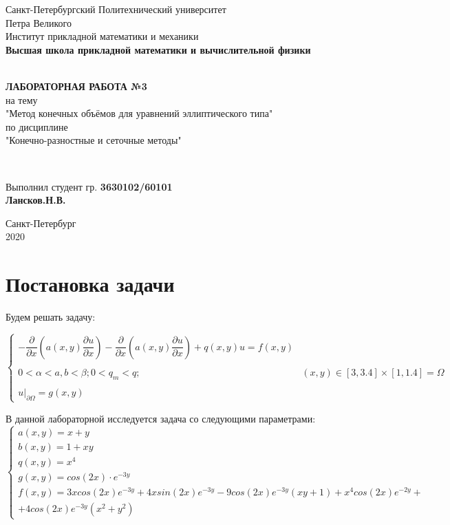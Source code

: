 \documentclass[12pt]{article}
\renewcommand{\listoffigures}{\begingroup  %
\tocsection
\tocfile{\listfigurename}{lof}
\endgroup}
\renewcommand{\listoftables}{\begingroup  %
\tocsection
\tocfile{\listtablename}{lot}
\endgroup}
\begin{document}
\begin{titlepage}
	\center
		Санкт-Петербургский Политехнический 
		университет \\ Петра Великого\\
		Институт прикладной математики и механики
		\\ \textbf{Высшая школа прикладной математики и вычислительной физики}

	\vfill ~
	\textbf{
		\\ \large ЛАБОРАТОРНАЯ РАБОТА №3
	}
	\\	на тему 
	\\ "Метод конечных объёмов для уравнений эллиптического типа"
	\\ по дисциплине
	\\ "Конечно-разностные и сеточные методы"

	\vfill ~

	Выполнил студент гр. \textbf{3630102/60101} \\
	\textbf{Лансков.Н.В.} \\ 

\vfill

{\large}	Санкт-Петербург
\\ 2020
\end{titlepage}


\tableofcontents 
\newpage
\listoffigures
\newpage
\listoftables
\newpage

\section{Постановка задачи}

Будем решать задачу:

$$
\begin{cases}
-\dfrac{\partial}{\partial x}\left( a(x,y) \dfrac{\partial u}{\partial x}\right) - \dfrac{\partial}{\partial x}\left( a(x,y) \dfrac{\partial u}{\partial x}\right) + q(x,y)u = f(x,y)
\\ \\
0 < \alpha < a, b < \beta; 0 < q_m < q; & (x,y) \in [3, 3.4] \times [1, 1.4] = \Omega
\\ \\
u|_{\partial \Omega} = g(x, y)
\end{cases}
$$

В данной лабораторной исследуется задача со следующими параметрами:
$$
\begin{cases}
a(x,y) = x + y \\ 
b(x,y) = 1 + xy \\
q(x,y) = x^4 \\
g(x,y) = cos(2x) \cdot e^{-3y} \\
f(x,y) = 3xcos(2x)e^{-3y}+4xsin(2x)e^{-3y} - 9cos(2x)e^{-3y}(xy + 1) + x^4cos(2x)e^{-2y} + \\ + 4cos(2x)e^{-3y}(x^2 + y^2)
\end{cases}
$$
\end{document}
